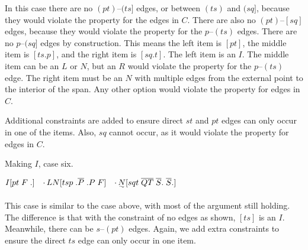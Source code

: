 In this case there are no $(pt)$--$(ts]$ edges, or between $(ts)$ and $(sq]$, because they would violate the \oneEC property for the edges in $C$.
There are also no $(pt)$--$[sq]$ edges, because they would violate the \oneEC property for the $p$--$(ts)$ edges.
There are no $p$--$(sq]$ edges by construction.
This means the left item is $[pt]$, the middle item is $[ts.p]$, and the right item is $[sq.t]$.
The left item is an $I$.
The middle item can be an $L$ or $N$, but an $R$ would violate the \oneEC property for the $p$--$(ts)$ edge.
The right item must be an $N$ with multiple edges from the external point to the interior of the span.
Any other option would violate the \oneEC property for edges in $C$.

Additional constraints are added to ensure direct $st$ and $pt$ edges can only occur in one of the items.
Also, $sq$ cannot occur, as it would violate the \oneEC property for edges in $C$.

\begin{finalEquation}
\caption{Making $I$, case six.}
  $I[pt \; F \; .] \quad \cdotp LN[tsp \; .\overline{P} \; .P \; F] \quad \cdotp \uwave{N}[sqt \; \overline{QT} \; \overline{S}. \; \overline{S}.]$
\end{finalEquation}

\begin{center}
\end{center}

This case is similar to the case above, with most of the argument still holding.
The difference is that with the constraint of no edges as shown, $[ts]$ is an $I$.
Meanwhile, there can be $s$--$(pt)$ edges.
Again, we add extra constraints to ensure the direct $ts$ edge can only occur in one item.

